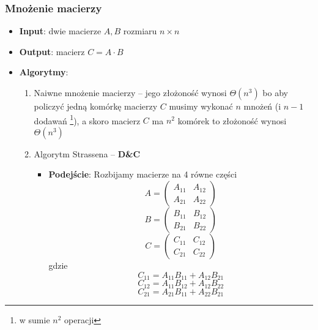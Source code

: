 \documentclass[11pt,a4paper]{article}
\begin{document}
\subsubsection{Mnożenie macierzy}
\begin{itemize}
    \item \textbf{Input}: dwie macierze $A, B$ rozmiaru $n \times n$
    \item \textbf{Output}: macierz $C = A \cdot B$
    \item \textbf{Algorytmy}:
        \begin{enumerate}
            \item Naiwne mnożenie macierzy -- jego złożoność wynosi $\Theta(n^3)$ bo aby policzyć jedną komórkę macierzy $C$ musimy wykonać $n$ mnożeń (i $n-1$ dodawań \footnote{w sumie $n^2$ operacji}), a skoro macierz $C$ ma $n^2$ komórek to złożoność wynosi $\Theta(n^3)$
            \item Algorytm Strassena -- \textbf{D\&C}
                \begin{itemize}
                    \item \textbf{Podejście}: Rozbijamy macierze na 4 równe części
                        \[
                            A = \begin{pmatrix}
                                A_{11} & A_{12} \\
                                A_{21} & A_{22}
                            \end{pmatrix}
                        \]
                        \[
                            B = \begin{pmatrix}
                                B_{11} & B_{12} \\
                                B_{21} & B_{22}
                            \end{pmatrix}
                        \]
                        \[
                            C = \begin{pmatrix}
                                C_{11} & C_{12} \\
                                C_{21} & C_{22}
                            \end{pmatrix}
                        \]
                        gdzie
                        \[
                            C_{11} = A_{11}B_{11} + A_{12}B_{21}
                        \]
                        \[
                            C_{12} = A_{11}B_{12} + A_{12}B_{22}
                        \]
                        \[
                            C_{21} = A_{21}B_{11} + A_{22}B_{21}
\]
\end{itemize}
\end{enumerate}
\end{itemize}
\end{document}
